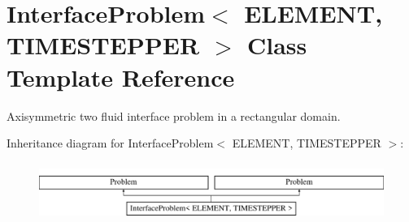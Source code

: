 \hypertarget{classInterfaceProblem}{}\section{Interface\+Problem$<$ E\+L\+E\+M\+E\+NT, T\+I\+M\+E\+S\+T\+E\+P\+P\+ER $>$ Class Template Reference}
\label{classInterfaceProblem}


Axisymmetric two fluid interface problem in a rectangular domain.  


Inheritance diagram for Interface\+Problem$<$ E\+L\+E\+M\+E\+NT, T\+I\+M\+E\+S\+T\+E\+P\+P\+ER $>$\+:\begin{figure}[H]
\begin{center}
\leavevmode
\includegraphics[height=1.924399cm]{classInterfaceProblem}
\end{center}
\end{figure}
